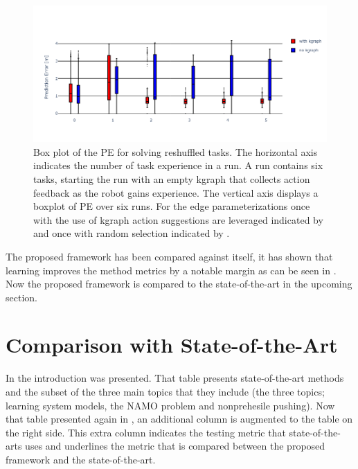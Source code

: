 \begin{figure}[H]
    \centering
    \includegraphics[width=\textwidth]{figures/results/random_push_pe_vs}
    \caption{Box plot of the \acl{PE} for solving reshuffled tasks. The horizontal axis indicates the number of task experience in a run. A run contains six tasks, starting the run with an empty \ac{kgraph} that collects action feedback as the robot gains experience. The vertical axis displays a boxplot of \acl{PE} over six runs. For the edge parameterizations once with the use of \ac{kgraph} action suggestions are leveraged indicated by  and once with random selection indicated by .}%
    \label{fig:random_push_pe_vs}
\end{figure}

The proposed framework has been compared against itself, it has shown that learning improves the method metrics by a notable margin as can be seen in . Now the proposed framework is compared to the state-of-the-art in the upcoming section.\bs

\section{Comparison with State-of-the-Art}%
\label{sec:compare_with_related_papers}
In the introduction  was presented. That table presents state-of-the-art methods and the subset of the three main topics that they include (the three topics; learning system models, the \ac{NAMO} problem and nonprehesile pushing). Now that table presented again in , an additional column is augmented to the table on the right side. This extra column indicates the testing metric that state-of-the-arts uses and underlines the metric that is compared between the proposed framework and the state-of-the-art.\bs

